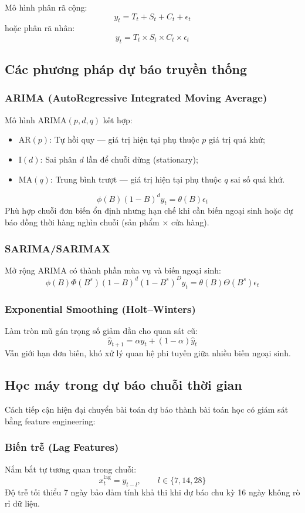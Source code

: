 \documentclass[12pt,a4paper]{report}
\begin{document}
Mô hình phân rã cộng:
\[
    y_t = T_t + S_t + C_t + \epsilon_t
\]
hoặc phân rã nhân:
\[
    y_t = T_t \times S_t \times C_t \times \epsilon_t
\]

\subsection{Các phương pháp dự báo truyền thống}

\subsubsection{ARIMA (AutoRegressive Integrated Moving Average)}
Mô hình ARIMA$(p, d, q)$ kết hợp:
\begin{itemize}
    \item AR$(p)$: Tự hồi quy --- giá trị hiện tại phụ thuộc $p$ giá trị quá khứ;
    \item I$(d)$: Sai phân $d$ lần để chuỗi dừng (stationary);
    \item MA$(q)$: Trung bình trượt --- giá trị hiện tại phụ thuộc $q$ sai số quá khứ.
\end{itemize}
\[
    \phi(B)(1-B)^d y_t = \theta(B)\epsilon_t
\]
Phù hợp chuỗi đơn biến ổn định nhưng hạn chế khi cần biến ngoại sinh hoặc dự báo đồng thời hàng nghìn chuỗi (sản phẩm $\times$ cửa hàng).

\subsubsection{SARIMA/SARIMAX}
Mở rộng ARIMA có thành phần mùa vụ và biến ngoại sinh:
\[
    \phi(B)\Phi(B^s)(1-B)^d(1-B^s)^D y_t = \theta(B)\Theta(B^s)\epsilon_t
\]

\subsubsection{Exponential Smoothing (Holt--Winters)}
Làm tròn mũ gán trọng số giảm dần cho quan sát cũ:
\[
    \hat{y}_{t+1} = \alpha y_t + (1-\alpha)\hat{y}_t
\]
Vẫn giới hạn đơn biến, khó xử lý quan hệ phi tuyến giữa nhiều biến ngoại sinh.

\subsection{Học máy trong dự báo chuỗi thời gian}
Cách tiếp cận hiện đại chuyển bài toán dự báo thành bài toán học có giám sát bằng feature engineering:

\subsubsection{Biến trễ (Lag Features)}
Nắm bắt tự tương quan trong chuỗi:
\[
    x^{\mathrm{lag}}_t = y_{t-l}, \qquad l \in \{7, 14, 28\}
\]
Độ trễ tối thiểu 7 ngày bảo đảm tính khả thi khi dự báo chu kỳ 16 ngày không rò rỉ dữ liệu.
\end{document}
